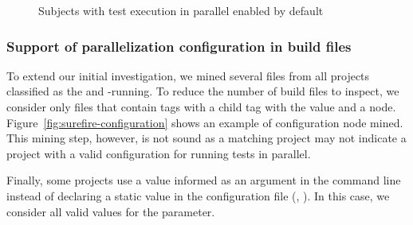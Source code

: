 \begin{figure}[ht!]
    \centering
    \caption{Subjects with test execution in parallel enabled by
    default}
    \label{tab:freqmodes-dynamic}
\end{figure}

\subsubsection{Support of parallelization configuration in build files}
\label{sec:rqC-2}

To extend our initial investigation, we mined several \pomf{} files
from all \numMedLong{} projects classified as the \medg{} and
\longg{}-running.
To reduce the number of build files
to inspect, we consider only \pomf{} files that contain
 tags with a child tag  with the
value  and a 
node. Figure~\ref{fig:surefire-configuration} shows an example of
configuration node mined. This mining step, however, is not sound as a matching project may not 
indicate a project with a valid configuration for running tests in parallel.

Finally, some projects use a value informed as an argument in the
command line instead of declaring a static value in the configuration
file (\ie, \pomf{}). In this case, we consider all valid values for
the parameter.

